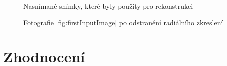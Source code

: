 \documentclass[11pt,oneside,a4paper,pdftex]{article}   %
\begin{document}
\begin{figure}[htb]
{			}
			\\
			\subfigure[] {
				\fbox{\begin{minipage}{3cm}\hfill\vspace{4cm}\end{minipage}}
			}
			\subfigure[] {
				\fbox{\begin{minipage}{3cm}\hfill\vspace{4cm}\end{minipage}}
			}
			\subfigure[] {
				\fbox{\begin{minipage}{3cm}\hfill\vspace{4cm}\end{minipage}}
			}
			\subfigure[] {
				\fbox{\begin{minipage}{3cm}\hfill\vspace{4cm}\end{minipage}}
			}
		\caption{Nasnímané snímky, které byly použity pro rekonstrukci}
		\label{fig:inputPictures}
	\end{figure}

	\begin{figure}[htb]
		\centering
		\caption{Fotografie \ref{fig:firstInputImage} po odstranění radiálního zkreslení}
		\label{fig:linearizedPictureExample}
	\end{figure}

\section{Zhodnocení}




%


\end{document}
